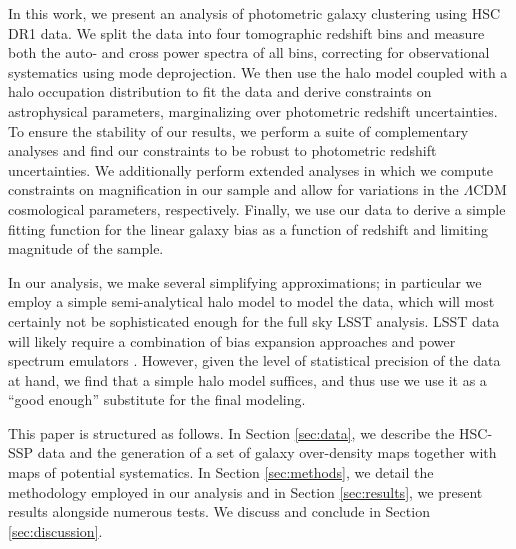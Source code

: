 \documentclass[a4paper,11pt]{article}
\begin{document}
In this work, we present an analysis of photometric galaxy clustering using HSC DR1 data. We split the data into four tomographic redshift bins and measure both the auto- and cross power spectra of all bins, correcting for observational systematics using mode deprojection. We then use the halo model coupled with a halo occupation distribution to fit the data and derive constraints on astrophysical parameters, marginalizing over photometric redshift uncertainties. To ensure the stability of our results, we perform a suite of complementary analyses and find our constraints to be robust to photometric redshift uncertainties. We additionally perform extended analyses in which we compute constraints on magnification in our sample and allow for variations in the $\Lambda$CDM cosmological parameters, respectively. Finally, we use our data to derive a simple fitting function for the linear galaxy bias as a function of redshift and limiting magnitude of the sample.

In our analysis, we make several simplifying approximations; in particular we employ a simple semi-analytical halo model to model the data, which will most certainly not be sophisticated enough for the full sky LSST analysis. LSST data will likely require  a combination of  bias expansion approaches \cite{0902.0991,1402.5916,1611.09787,1910.07097} and power spectrum emulators \cite{1804.05865,1705.03388}. However, given the level of statistical precision of the data at hand, we find that a simple halo model suffices, and thus use we use it as a ``good enough'' substitute for the final modeling.

This paper is structured as follows. In Section \ref{sec:data}, we describe the HSC-SSP data and the generation of a set of galaxy over-density maps together with maps of potential systematics. In Section \ref{sec:methods}, we detail the methodology employed in our analysis and in Section \ref{sec:results}, we present results alongside numerous tests. We discuss and conclude in Section \ref{sec:discussion}.
\end{document}
